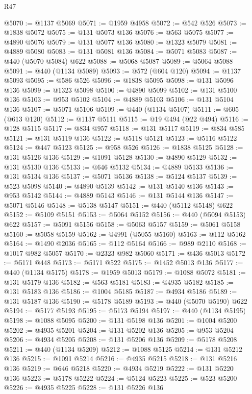 \begin{lexlean}{R47}
\begin{coremodule}
@5070 := @1137 @5069
@5071 := @1959 @4958
@5072 := @542 @526
@5073 := @1838 @5072
@5075 := @131 @5073 @136
@5076 := @563 @5075
@5077 := @4890 @5076
@5079 := @131 @5077 @136
@5080 := @1323 @5079
@5081 := @4889 @5080
@5083 := @131 @5081 @136
@5084 := @5071 @5083
@5087 := @440 (@5070 @5084) @622
@5088 := @5068 @5087
@5089 := @5064 @5088
@5091 := @440 (@1134 @5089)
@5093 := @572 (@604 @120)
@5094 := @1137 @5093
@5095 := @586 @526
@5096 := @1838 @5095
@5098 := @131 @5096 @136
@5099 := @1323 @5098
@5100 := @4890 @5099
@5102 := @131 @5100 @136
@5103 := @953 @5102
@5104 := @4889 @5103
@5106 := @131 @5104 @136
@5107 := @5071 @5106
@5109 := @440 (@1134 @5107)
@5111 := @605 (@613 @120)
@5112 := @1137 @5111
@5115 := @19 @494 (@22 @494)
@5116 := @128 @5115
@5117 := @834 @957
@5118 := @131 @5117
@5119 := @834 @585
@5121 := @131 @5119 @136
@5122 := @5118 @5121
@5123 := @5116 @5122
@5124 := @447 @5123
@5125 := @958 @526
@5126 := @1838 @5125
@5128 := @131 @5126 @136
@5129 := @1091 @5128
@5130 := @4890 @5129
@5132 := @131 @5130 @136
@5133 := @646 @5132
@5134 := @4889 @5133
@5136 := @131 @5134 @136
@5137 := @5071 @5136
@5138 := @5124 @5137
@5139 := @523 @5098
@5140 := @4890 @5139
@5142 := @131 @5140 @136
@5143 := @953 @5142
@5144 := @4889 @5143
@5146 := @131 @5144 @136
@5147 := @5071 @5146
@5148 := @5138 @5147
@5151 := @440 (@5112 @5148) @622
@5152 := @5109 @5151
@5153 := @5064 @5152
@5156 := @440 (@5094 @5153) @622
@5157 := @5091 @5156
@5158 := @5063 @5157
@5159 := @5061 @5158
@5160 := @5058 @5159
@5162 := @4991 (@5055 @5160)
@5163 := @112 @5162
@5164 := @1490 @2036
@5165 := @112 @5164
@5166 := @989 @2110
@5168 := @1017 @982 @5057
@5170 := @2323 @982 @5060
@5171 := @436 @5013
@5172 := @5171 @448
@5173 := @5171 @522
@5175 := @1452 @5013 @136
@5177 := @440 (@1134 @5175)
@5178 := @1959 @5013
@5179 := @1088 @5072
@5181 := @131 @5179 @136
@5182 := @563 @5181
@5183 := @4935 @5182
@5185 := @131 @5183 @136
@5186 := @1004 @5185
@5187 := @4934 @5186
@5189 := @131 @5187 @136
@5190 := @5178 @5189
@5193 := @440 (@5070 @5190) @622
@5194 := @5177 @5193
@5195 := @5173 @5194
@5197 := @440 (@1134 @5195)
@5198 := @1088 @5095
@5200 := @131 @5198 @136
@5201 := @1004 @5200
@5202 := @4935 @5201
@5204 := @131 @5202 @136
@5205 := @953 @5204
@5206 := @4934 @5205
@5208 := @131 @5206 @136
@5209 := @5178 @5208
@5211 := @440 (@1134 @5209)
@5212 := @1088 @5125
@5214 := @131 @5212 @136
@5215 := @1091 @5214
@5216 := @4935 @5215
@5218 := @131 @5216 @136
@5219 := @646 @5218
@5220 := @4934 @5219
@5222 := @131 @5220 @136
@5223 := @5178 @5222
@5224 := @5124 @5223
@5225 := @523 @5200
@5226 := @4935 @5225
@5228 := @131 @5226 @136

\end{coremodule}
\end{lexlean}
